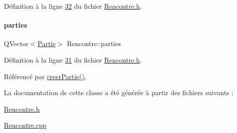Définition à la ligne \hyperlink{_rencontre_8h_source_l00032}{32} du fichier \hyperlink{_rencontre_8h_source}{Rencontre.\+h}.

\mbox{\label{class_rencontre_a6b52ccf9b5d083718928b207ae5316fe}} 
\paragraph{\texorpdfstring{parties}{parties}}
{\footnotesize\ttfamily Q\+Vector$<$\hyperlink{class_partie}{Partie}$>$ Rencontre\+::parties\hspace{0.3cm}{\ttfamily [private]}}



Définition à la ligne \hyperlink{_rencontre_8h_source_l00031}{31} du fichier \hyperlink{_rencontre_8h_source}{Rencontre.\+h}.



Référencé par \hyperlink{_rencontre_8cpp_source_l00031}{creer\+Partie()}.



La documentation de cette classe a été générée à partir des fichiers suivants \+:\begin{DoxyCompactItemize}
\item 
\hyperlink{_rencontre_8h}{Rencontre.\+h}\item 
\hyperlink{_rencontre_8cpp}{Rencontre.\+cpp}\end{DoxyCompactItemize}
